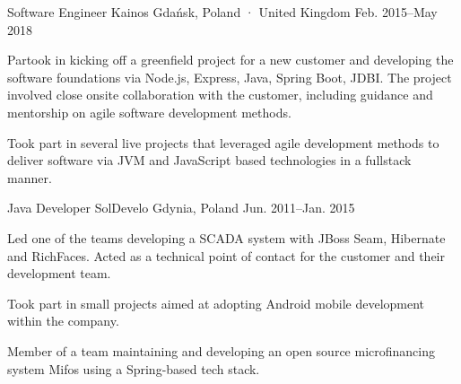 \begin{cventries}
  \cventry
    {Software Engineer} %
    {Kainos} %
    {Gdańsk, Poland · United Kingdom} %
    {Feb. 2015–May 2018} %
    {
      \begin{cvitems} %
        \item {Partook in kicking off a greenfield project for a new customer and developing the software foundations via Node.js, Express, Java, Spring Boot, JDBI. The project involved close onsite collaboration with the customer, including guidance and mentorship on agile software development methods.}
        \item {Took part in several live projects that leveraged agile development methods to deliver software via JVM and JavaScript based technologies in a fullstack manner.}
      \end{cvitems}
    }

  \cventry
    {Java Developer} %
    {SolDevelo} %
    {Gdynia, Poland} %
    {Jun. 2011–Jan. 2015} %
    {
      \begin{cvitems} %
        \item {Led one of the teams developing a SCADA system with JBoss Seam, Hibernate and RichFaces. Acted as a technical point of contact for the customer and their development team.}
        \item {Took part in small projects aimed at adopting Android mobile development within the company.}
        \item {Member of a team maintaining and developing an open source microfinancing system Mifos using a Spring-based tech stack.}
      \end{cvitems}
    }

\end{cventries}

